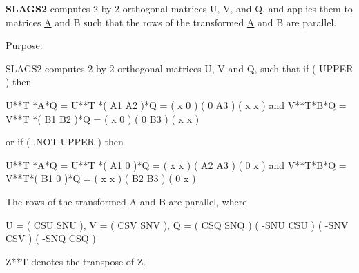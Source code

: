 {\bfseries S\+L\+A\+G\+S2} computes 2-\/by-\/2 orthogonal matrices U, V, and Q, and applies them to matrices \hyperlink{classA}{A} and B such that the rows of the transformed \hyperlink{classA}{A} and B are parallel. 

 \begin{DoxyParagraph}{Purpose\+: }
\begin{DoxyVerb} SLAGS2 computes 2-by-2 orthogonal matrices U, V and Q, such
 that if ( UPPER ) then

           U**T *A*Q = U**T *( A1 A2 )*Q = ( x  0  )
                             ( 0  A3 )     ( x  x  )
 and
           V**T*B*Q = V**T *( B1 B2 )*Q = ( x  0  )
                            ( 0  B3 )     ( x  x  )

 or if ( .NOT.UPPER ) then

           U**T *A*Q = U**T *( A1 0  )*Q = ( x  x  )
                             ( A2 A3 )     ( 0  x  )
 and
           V**T*B*Q = V**T*( B1 0  )*Q = ( x  x  )
                           ( B2 B3 )     ( 0  x  )

 The rows of the transformed A and B are parallel, where

   U = (  CSU  SNU ), V = (  CSV SNV ), Q = (  CSQ   SNQ )
       ( -SNU  CSU )      ( -SNV CSV )      ( -SNQ   CSQ )

 Z**T denotes the transpose of Z.\end{DoxyVerb}
 
\end{DoxyParagraph}


